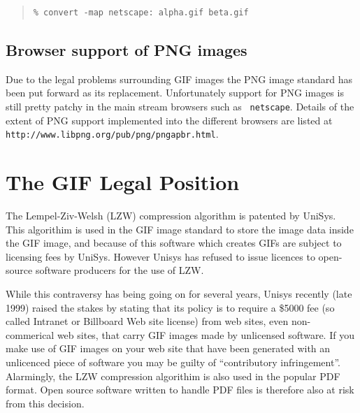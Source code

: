 \documentclass[twoside,11pt]{article}
\newcommand{\htmladdnormallink}[2]{#1}
\newcommand{\htmlref}[2]{#1}
\newcommand{\xlabel}[1]{}
\begin{document}
\small
\begin{quote}
\begin{verbatim}
% convert -map netscape: alpha.gif beta.gif
\end{verbatim}
\end{quote}
\normalsize

\subsection{\xlabel{sc15_browser+png}Browser support of PNG images\label{sc15_browser+png}}

Due to the \htmlref{legal problems}{sc15_giflegal} surrounding GIF
images the PNG image standard has been put forward as its replacement.
Unfortunately support for PNG images is still pretty patchy in the
main stream browsers such as \htmladdnormallink{{\tt
netscape}}{http://www.netscape.com}. Details of the extent of PNG
support implemented into the different browsers are listed at
\htmladdnormallink{{\tt
http://www.libpng.org/pub/png/pngapbr.html}}{http://www.libpng.org/pub/png/pngapbr.html}.

\section{\xlabel{sc15_giflegal}The GIF Legal Position\label{sc15_giflegal}}

The Lempel-Ziv-Welsh (LZW) compression algorithm is
\htmladdnormallink{patented}{http://www.patents.ibm.com/details?pn=US04558302__}
by UniSys.  This algorithim is used in the GIF image standard to store
the image data inside the GIF image, and because of this software
which creates GIFs are subject to licensing fees by UniSys. However
Unisys has refused to issue licences to open-source software producers
for the use of LZW.

While this contraversy has being going on for several years, Unisys
\htmladdnormallink{recently}{http://www.unisys.com/unisys/lzw/lzw-license.asp}
(late 1999) raised the stakes by stating that its policy is to require
a \$5000 fee (so called Intranet or Billboard Web site license) from
web sites, even non-commerical web sites, that carry GIF images made
by unlicensed software. If you make use of GIF images on your web site
that have been generated with an unlicenced piece of software you may
be guilty of ``contributory infringement''. Alarmingly, the LZW
compression algorithim is also used in the popular PDF format. Open
source software written to handle PDF files is therefore also at risk
from this decision.
\end{document}
